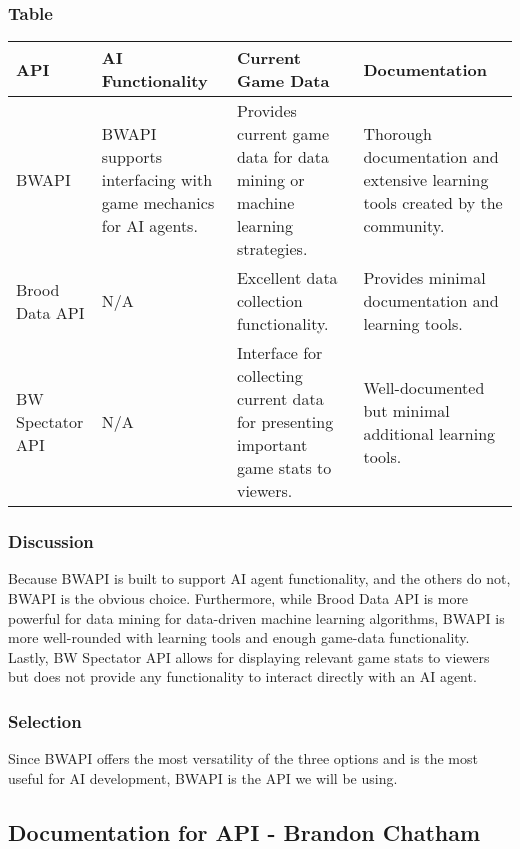 \subsubsection{Table}
\begin{center}
	\begin{tabular}{ ||B|M|M|M|| } 
		\hline
		API & AI Functionality & Current Game Data & Documentation \\
		\hline
		BWAPI & BWAPI supports interfacing with game mechanics for AI agents. & Provides current game data for data mining or machine learning strategies. & Thorough documentation and extensive learning tools created by the community. \\ 
		\hline
		Brood Data API & N/A & Excellent data collection functionality. & Provides minimal documentation and learning tools. \\ 
		\hline
		BW Spectator API & N/A  & Interface for collecting current data for presenting important game stats to viewers. & Well-documented but minimal additional learning tools. \\ 
		\hline
	\end{tabular}
\end{center}
\subsubsection{Discussion}
	Because BWAPI is built to support AI agent functionality, and the others do not, BWAPI is the obvious choice. Furthermore, while Brood Data API is more powerful for data mining for data-driven machine learning algorithms, BWAPI is more well-rounded with learning tools and enough game-data functionality. Lastly, BW Spectator API allows for displaying relevant game stats to viewers but does not provide any functionality to interact directly with an AI agent.
\subsubsection{Selection}
	Since BWAPI offers the most versatility of the three options and is the most useful for AI development, BWAPI is the API we will be using. 
\subsection{Documentation for API - Brandon Chatham}
